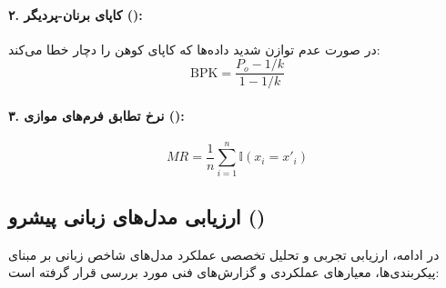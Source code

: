 \paragraph*{۲. کاپای برنان-پردیگر ():}
در صورت عدم توازن شدید داده‌ها که کاپای کوهن را دچار خطا می‌کند:
\begin{equation}
    \text{BPK} = \frac{P_o - 1/k}{1 - 1/k}
\end{equation}

\paragraph*{۳. نرخ تطابق فرم‌های موازی ():}
\begin{equation}
    MR = \frac{1}{n} \sum_{i=1}^n \mathbb{I}(x_i = x'_i)
\end{equation}

\subsection*{ارزیابی مدل‌های زبانی پیشرو ()}
در ادامه، ارزیابی تجربی و تحلیل تخصصی عملکرد مدل‌های شاخص زبانی بر مبنای پیکربندی‌ها، معیارهای عملکردی و گزارش‌های فنی مورد بررسی قرار گرفته است:

\begin{itemize}
    
    
    
    
    
    
    
    
\end{itemize}